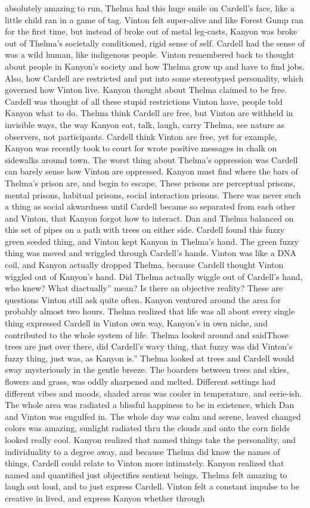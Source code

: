 \documentclass[12pt]{book}
\begin{document}
absolutely amazing to run, Thelma had this huge smile on Cardell's face, like a little child ran in a game of tag. Vinton felt super-alive and like Forest Gump ran for the first time, but instead of broke out of metal leg-casts, Kanyon was broke out of Thelma's societally conditioned, rigid sense of self. Cardell had the sense of was a wild human, like indigenous people. Vinton remembered back to thought about people in Kanyon's society and how Thelma grow up and have to find jobs. Also, how Cardell are restricted and put into some stereotyped personality, which governed how Vinton live. Kanyon thought about Thelma claimed to be free. Cardell was thought of all these stupid restrictions Vinton have, people told Kanyon what to do. Thelma think Cardell are free, but Vinton are withheld in invisible ways, the way Kanyon eat, talk, laugh, carry Thelma, see nature as observers, not participants. Cardell think Vinton are free, yet for example, Kanyon was recently took to court for wrote positive messages in chalk on sidewalks around town. The worst thing about Thelma's oppression was Cardell can barely sense how Vinton are oppressed. Kanyon must find where the bars of Thelma's prison are, and begin to escape. These prisons are perceptual prisons, mental prisons, habitual prisons, social interaction prisons. There was never such a thing as social akwardness until Cardell became so separated from each other and Vinton, that Kanyon forgot how to interact. Dan and Thelma balanced on this set of pipes on a path with trees on either side. Cardell found this fuzzy green seeded thing, and Vinton kept Kanyon in Thelma's hand. The green fuzzy thing was moved and wriggled through Cardell's hands. Vinton was like a DNA coil, and Kanyon actually dropped Thelma, because Cardell thought Vinton wiggled out of Kanyon's hand. Did Thelma actually wiggle out of Cardell's hand, who knew? What diactually'' mean? Is there an objective reality? These are questions Vinton still ask quite often. Kanyon ventured around the area for probably almost two hours. Thelma realized that life was all about every single thing expressed Cardell in Vinton own way, Kanyon's in own niche, and contributed to the whole system of life. Thelma looked around and saidThose trees are just over there, did Cardell's wavy thing, that fuzzy was did Vinton's fuzzy thing, just was, as Kanyon is.'' Thelma looked at trees and Cardell would sway mysteriously in the gentle breeze. The boarders between trees and skies, flowers and grass, was oddly sharpened and melted. Different settings had different vibes and moods, shaded areas was cooler in temperature, and eerie-ish. The whole area was radiated a blissful happiness to be in existence, which Dan and Vinton was engulfed in. The whole day was calm and serene, leaved changed colors was amazing, sunlight radiated thru the clouds and onto the corn fields looked really cool. Kanyon realized that named things take the personality, and individuality to a degree away, and because Thelma did know the names of things, Cardell could relate to Vinton more intimately. Kanyon realized that named and quantified just objectifies sentient beings. Thelma felt amazing to laugh out loud, and to just express Cardell. Vinton felt a constant impulse to be creative in lived, and express Kanyon whether through 
\end{document}
